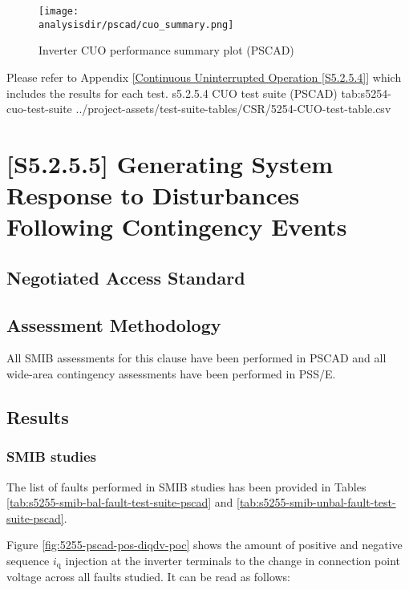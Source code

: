 \documentclass{../grid-link-report}
\newcommand{\projectassetsdir}{../project-assets}
\newcommand{\analysisdir}{report-assets/analysis}
\begin{document}
	\begin{figure}[H]
		\centering
		\texttt{[image: \\analysisdir/pscad/cuo\_summary.png]}
		\caption{Inverter CUO performance summary plot (PSCAD)}
		\label{fig:s5254-cuo-summary-pscad}
	\end{figure}
	


	Please refer to Appendix \ref{Continuous Uninterrupted Operation [S5.2.5.4]} which includes the results for each test.
	{
		\fontsize{7}{9}\selectfont
		\autoscaledlongtable
		{s5.2.5.4 CUO test suite (PSCAD)}
		{tab:s5254-cuo-test-suite}
		{\projectassetsdir/test-suite-tables/CSR/5254-CUO-test-table.csv}
	}

	\section{[S5.2.5.5] Generating System Response to Disturbances Following Contingency Events}
	\subsection{Negotiated Access Standard}
	\begin{tcolorbox}[lightgreenbox]
		
	\end{tcolorbox}
	\subsection{Assessment Methodology}
	

	
	All SMIB assessments for this clause have been performed in PSCAD and all wide-area contingency assessments have been performed in PSS/E.
	
	\subsection{Results}
	
	
	\subsubsection{SMIB studies}
	The list of faults performed in SMIB studies has been provided in Tables \ref{tab:s5255-smib-bal-fault-test-suite-pscad} and \ref{tab:s5255-smib-unbal-fault-test-suite-pscad}.

	
	Figure \ref{fig:5255-pscad-pos-diqdv-poc} shows the amount of positive and negative sequence $i_{\text{q}}$ injection at the inverter terminals to the change in connection point voltage across all faults studied. It can be read as follows:
	
\end{document}
